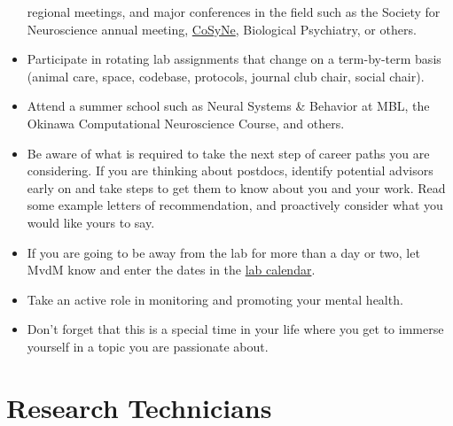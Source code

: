 \documentclass{tufte-book}
\begin{document}
\begin{itemize}
{  regional meetings, and major conferences in the field such as the
  Society for Neuroscience annual meeting, \href{www.cosyne.org}{CoSyNe}, Biological Psychiatry, or
  others.}
\item{Participate in rotating lab assignments that change on a term-by-term
basis (animal care, space, codebase, protocols, journal club chair,
social chair).}
\item{Attend a summer school such as Neural Systems \& Behavior at
  MBL, the Okinawa Computational Neuroscience
  Course, and
  others.}
\item{Be aware of what is required to take the next step of career
  paths you are considering. If you are
  thinking about postdocs, identify potential advisors early on and
  take steps to get them to know about you and your work. Read some
  example letters of recommendation, and proactively consider what you
  would like yours to say.}
\item{If you are going to be away from the lab for more than a day or
  two, let MvdM know and enter the dates in the \href{ADD LAB CALENDAR
    LINK}{lab calendar}.}
\item{Take an active role in monitoring and promoting your mental
  health.}
\item{Don't forget that this is a special time in your life where you get
  to immerse yourself in a topic you are passionate about.}
\end{itemize}

\section{Research Technicians}
\end{document}
